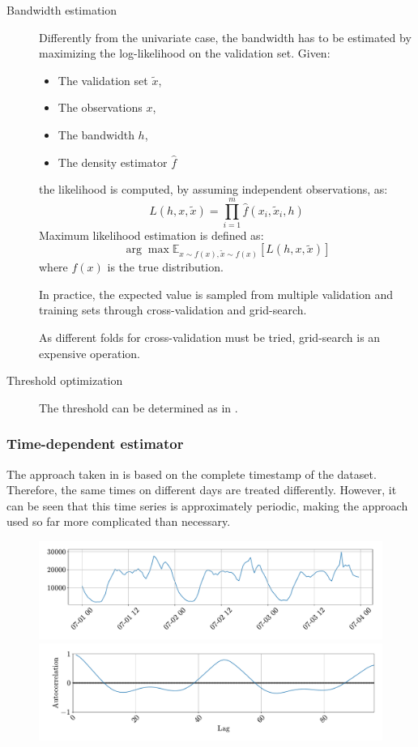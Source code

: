 \begin{description}
    \item[Bandwidth estimation]
        Differently from the univariate case, the bandwidth has to be estimated by maximizing the log-likelihood on the validation set. Given:
        \begin{itemize}
            \item The validation set $\tilde{x}$,
            \item The observations $x$,
            \item The bandwidth $h$,
            \item The density estimator $\hat{f}$
        \end{itemize}
        the likelihood is computed, by assuming independent observations, as:
        \[ L(h, x, \tilde{x}) = \prod_{i=1}^{m} \hat{f}(x_i, \tilde{x}_i, h) \]
        Maximum likelihood estimation is defined as:
        \[ \arg\max \mathbb{E}_{x \sim f(x), \tilde{x} \sim f(x)}[ L(h, x, \tilde{x}) ] \]
        where $f(x)$ is the true distribution.

        In practice, the expected value is sampled from multiple validation and training sets through cross-validation and grid-search.

        \begin{remark}
            As different folds for cross-validation must be tried, grid-search is an expensive operation.
        \end{remark}

    \item[Threshold optimization]
        The threshold can be determined as in .
\end{description}


\subsubsection{Time-dependent estimator}

The approach taken in  is based on the complete timestamp of the dataset. Therefore, the same times on different days are treated differently. However, it can be seen that this time series is approximately periodic, making the approach used so far more complicated than necessary.

\begin{figure}[H]
    \centering
    \includegraphics[width=0.8\linewidth]{./img/_ad_taxi_periodic.pdf}
    \includegraphics[width=0.8\linewidth]{./img/_ad_taxi_periodic_autocorrelation.pdf}
\end{figure}


